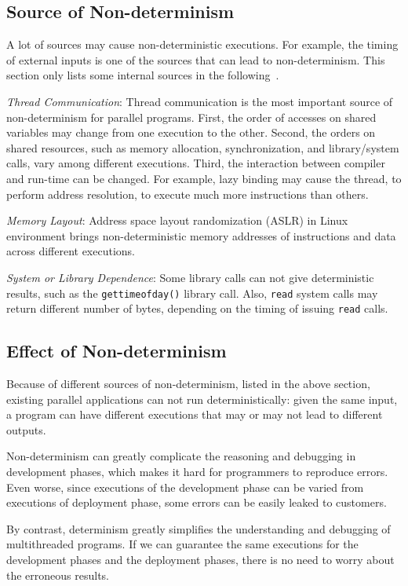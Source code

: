 \subsection{Source of Non-determinism}
A lot of sources may cause non-deterministic executions. 
For example, the timing of external inputs is one of the sources that can lead to non-determinism. This section only lists some internal sources in the following~\cite{costofdeterminism}. 
 
\emph{Thread Communication}: 
Thread communication is the most important source of non-determinism for parallel programs. 
First, the order of accesses on shared variables may change from one execution to the other. Second, the orders on shared resources, such as memory allocation, synchronization, and library/system calls, vary among different executions. 
Third, the interaction between compiler and run-time can be changed. For example, lazy binding may cause the thread, to perform address resolution, to execute much more instructions than others. 

\emph{Memory Layout}: 
Address space layout randomization (ASLR) in Linux environment brings non-deterministic memory addresses of instructions and data across different executions. 

\emph{System or Library Dependence}:
Some library calls can not give deterministic results, such as the \texttt{gettimeofday()} library call. Also, \texttt{read} system calls may return different number of bytes, depending on the timing of issuing \texttt{read} calls. 


\subsection{Effect of Non-determinism}
Because of different sources of non-determinism, listed in the above section, existing parallel applications can not run deterministically: given the same input, a program can have different executions that may or may not lead to different outputs. 

Non-determinism can greatly complicate the reasoning and debugging in development phases, which makes it hard for programmers to reproduce errors. 
Even worse, since executions of the development phase can be varied from executions of deployment phase, some errors can be easily leaked to customers.

By contrast, determinism greatly simplifies the understanding and debugging of multithreaded programs. If we can guarantee the same executions for the development phases and the deployment phases, there is no need to worry about the erroneous results. 

